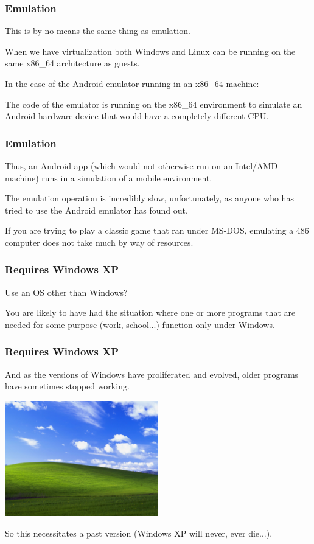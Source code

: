 \begin{frame}
\frametitle{Emulation}

This is by no means the same thing as \alert{emulation}. 

When we have virtualization both Windows and Linux can be running on the same x86\_64 architecture as guests. 

In the case of the Android emulator running in an x86\_64 machine: 

The code of the emulator is running on the x86\_64 environment to simulate an Android hardware device that would have a completely different CPU. 

\end{frame}

\begin{frame}
\frametitle{Emulation}

Thus, an Android app (which would not otherwise run on an Intel/AMD machine) runs in a simulation of a mobile environment. 

The emulation operation is incredibly slow, unfortunately, as anyone who has tried to use the Android emulator has found out. 

If you are trying to play a classic game that ran under MS-DOS, emulating a 486 computer does not take much by way of resources.



\end{frame}

\begin{frame}
\frametitle{Requires Windows XP}

Use an OS other than Windows? 

You are likely to have had the situation where one or more programs that are needed for some purpose (work, school...) function only under Windows. 

\end{frame}

\begin{frame}
\frametitle{Requires Windows XP}

And as the versions of Windows have proliferated and evolved, older programs have sometimes stopped working.

\begin{center}
	\includegraphics[width=0.5\textwidth]{images/winxp.jpg}
\end{center}

So this necessitates a past version (Windows XP will never, ever die...).

\end{frame}

